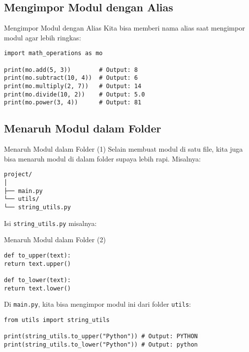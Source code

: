 \documentclass[aspectratio=169, table]{beamer}
\begin{document}
\subsection{Mengimpor Modul dengan Alias}
\begin{frame}[fragile]{Mengimpor Modul dengan Alias}
Kita bisa memberi nama alias saat mengimpor modul agar lebih ringkas:

\begin{lstlisting}[style=PythonStyle, caption={Kode Python: calculator.py}]
import math_operations as mo

print(mo.add(5, 3))        # Output: 8
print(mo.subtract(10, 4))  # Output: 6
print(mo.multiply(2, 7))   # Output: 14
print(mo.divide(10, 2))    # Output: 5.0
print(mo.power(3, 4))      # Output: 81
\end{lstlisting}
\end{frame}

\subsection{Menaruh Modul dalam Folder}
\begin{frame}[fragile]{Menaruh Modul dalam Folder (1)}
Selain membuat modul di satu file, kita juga bisa menaruh modul di dalam folder supaya lebih rapi. Misalnya:

\begin{verbatim}
project/
│
├── main.py
└── utils/
└── string_utils.py
\end{verbatim}

Isi \texttt{string_utils.py} misalnya:
\end{frame}

\begin{frame}[fragile]{Menaruh Modul dalam Folder (2)}
\begin{lstlisting}[style=PythonStyle, caption={Kode Python: utils/string_utils.py}]
def to_upper(text):
return text.upper()

def to_lower(text):
return text.lower()
\end{lstlisting}

Di \texttt{main.py}, kita bisa mengimpor modul ini dari folder \texttt{utils}:

\begin{lstlisting}[style=PythonStyle, caption={Kode Python: main.py}]
from utils import string_utils

print(string_utils.to_upper("Python")) # Output: PYTHON
print(string_utils.to_lower("Python")) # Output: python
\end{lstlisting}
\end{frame}
\end{document}
